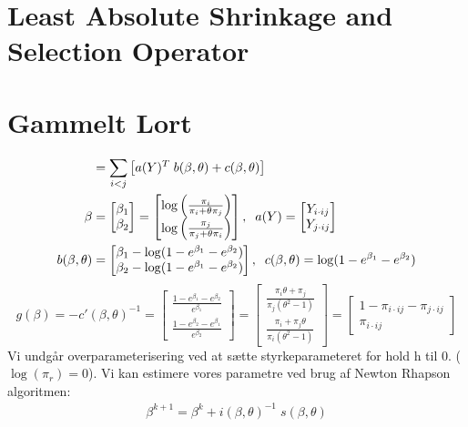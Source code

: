\documentclass[11pt,a4paper]{article}
\begin{document}
\section{Least Absolute Shrinkage and Selection Operator}

\section{Gammelt Lort}
\begin{align*}
    &=\sum_{i<j}\big{[}a(Y)^T\;b(\beta,\theta)+c(\beta,\theta)\big{]}\\
    \beta&=\begin{bmatrix}\beta_1\\ \beta_2\end{bmatrix}=\begin{bmatrix}\log\Big{(}\frac{\pi_i}{\pi_i+\theta\pi_j}\Big{)}\\\log\Big{(}\frac{\pi_j}{\pi_j+\theta\pi_i}\Big{)} \end{bmatrix},\;\;
    a(Y)=\begin{bmatrix}Y_{i\cdot ij}\\Y_{j\cdot ij}\end{bmatrix}\;\; \\
    b(\beta,\theta)&=\begin{bmatrix}\beta_1-\log(1-e^{\beta_1}-e^{\beta_2})\\\beta_2-\log(1-e^{\beta_1}-e^{\beta_2})\end{bmatrix},\;\;
     c(\beta,\theta)=\log(1-e^{\beta_1}-e^{\beta_2})
\end{align*}
$$
g(\beta)=-c'(\beta,\theta)^{-1}=\begin{bmatrix}\frac{1-e^{\beta_1}-e^{\beta_2}}{e^{\beta_1}}\\ \frac{1-e^{\beta_2}-e^{\beta_1}}{e^{\beta_2}}\end{bmatrix}
=
\begin{bmatrix}
\frac{\pi_i \theta + \pi_j}{\pi_j(\theta^2-1)}\\
\frac{\pi_i+\pi_j \theta}{\pi_i(\theta^2-1)}
\end{bmatrix}=\begin{bmatrix}1-\pi_{i\cdot ij}-\pi_{j\cdot ij}\\\pi_{i\cdot ij}\end{bmatrix}
$$
Vi undgår overparameterisering ved at sætte styrkeparameteret for hold h til 0. ($\log(\pi_r)=0$). 
Vi kan estimere vores parametre ved brug af Newton Rhapson algoritmen:
\begin{align}
\beta^{k+1}=\beta^k+i(\beta,\theta)^{-1} \; s(\beta,\theta)
\end{align}
\end{document}
